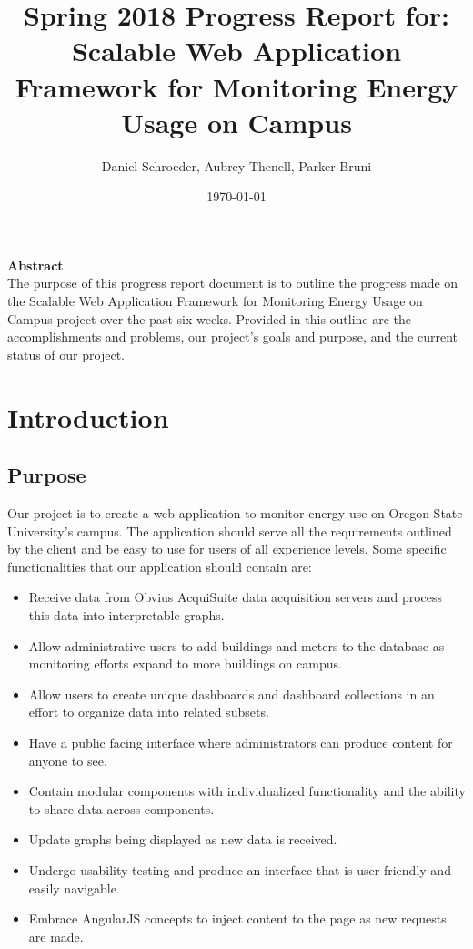 \documentclass[letterpaper,10pt,serif,draftclsnofoot,onecolumn,compsoc,titlepage]{IEEEtran}
\title{Spring 2018 Progress Report for: \linebreak Scalable Web Application Framework for Monitoring Energy Usage on Campus}
\author{Daniel Schroeder, Aubrey Thenell, Parker Bruni}
\date{\today}
\begin{document}
 \maketitle
 \vspace{2cm}
 \begin{center}
 \noindent \textbf{Abstract} \\
			 \indent The purpose of this progress report document is to outline the progress made on the Scalable Web Application
Framework for Monitoring Energy Usage on Campus project over the past six weeks. Provided in this outline
are the accomplishments and problems, our project's goals and purpose, and the current status of our project.
 \end{center}         
 
 \newpage
\tableofcontents
\newpage

\section{Introduction}
\subsection{Purpose} 
    Our project is to create a web application to monitor energy use on Oregon State University's campus. The application should serve all the requirements outlined by the client and be easy to use for users of all experience levels.
    \noindent Some specific functionalities that our application should contain are:
    \begin{itemize}
        \item Receive data from Obvius AcquiSuite data acquisition servers and process this data into interpretable graphs.
        \item Allow administrative users to add buildings and meters to the database as monitoring efforts expand to more buildings on campus.
        \item Allow users to create unique dashboards and dashboard collections in an effort to organize data into related subsets.
        \item Have a public facing interface where administrators can produce content for anyone to see.
        \item Contain modular components with individualized functionality and the ability to share data across components.
        \item Update graphs being displayed as new data is received.
        \item Undergo usability testing and produce an interface that is user friendly and easily navigable.
        \item Embrace AngularJS concepts to inject content to the page as new requests are made.
    \end{itemize}
\end{document}
